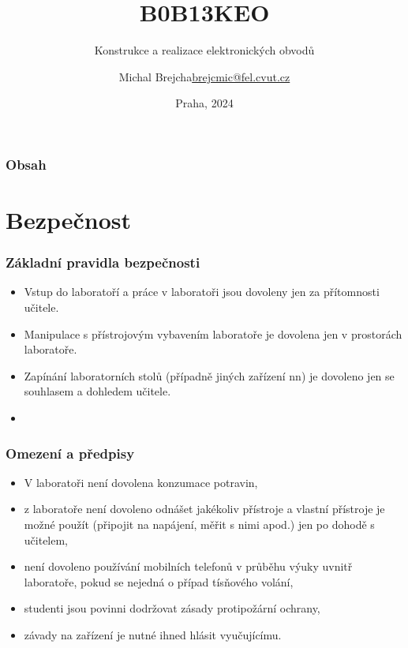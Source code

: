 \documentclass{beamer}
\title[B0B13KEO]{B0B13KEO}
\subtitle[KEO] {Konstrukce a realizace elektronických obvodů}
\author[Brejcha]{\texorpdfstring{Michal Brejcha\newline\url{brejcmic@fel.cvut.cz}}{Michal Brejcha}}
\institute[ČVUT]{ČVUT v Praze, FEL}
\date[Praha, 2024]{Praha, 2024}
\begin{document}
\frame{\titlepage}

\begin{frame}
\frametitle{Obsah} 
\tableofcontents
\end{frame}


\section{\texorpdfstring{Bezpečnost}{Bezpecnost}}
	\begin{frame}
    \frametitle{Základní pravidla bezpečnosti}
		\begin{itemize}
		\item Vstup do laboratoří a práce v laboratoři jsou dovoleny jen za přítomnosti učitele.
		\item Manipulace s přístrojovým vybavením laboratoře je dovolena jen v prostorách laboratoře.
		\item Zapínání laboratorních stolů (případně jiných zařízení nn) je dovoleno jen se souhlasem a dohledem učitele.
		\item \textbf{}
		\end{itemize}
	\end{frame}
	\begin{frame}
    \frametitle{Omezení a předpisy}
		\begin{itemize}
		\item V laboratoři není dovolena konzumace potravin,
    \item z laboratoře není dovoleno odnášet jakékoliv přístroje a vlastní přístroje je možné použít (připojit na napájení, měřit s nimi apod.) jen po dohodě s učitelem,
		\item není dovoleno používání mobilních telefonů v průběhu výuky uvnitř laboratoře, pokud se nejedná o případ tísňového volání,
		\item studenti jsou povinni dodržovat zásady protipožární ochrany,
		\item závady na zařízení je nutné ihned hlásit vyučujícímu.
		\end{itemize}
	\end{frame}
\end{document}
